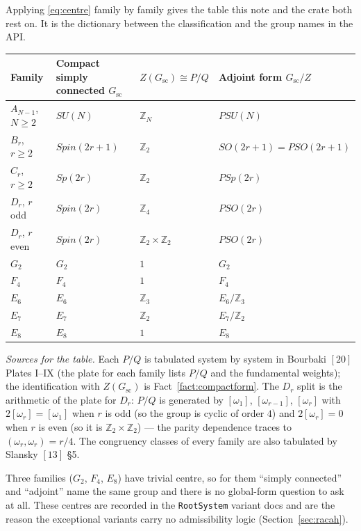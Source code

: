 \documentclass[11pt,a4paper]{article}
\theoremstyle{plain}
\theoremstyle{definition}
\newcommand{\ZZ}{\mathbb{Z}}
\newcommand{\code}[1]{\texttt{#1}}
\begin{document}
Applying \eqref{eq:centre} family by family gives the table this note and the
crate both rest on. It is the dictionary between the classification and the
group names in the API.

\begin{center}
\small
\begin{tabular}{@{}llll@{}}
\toprule
Family & Compact simply connected $G_{\mathrm{sc}}$ & $Z(G_{\mathrm{sc}})\cong P/Q$ & Adjoint form $G_{\mathrm{sc}}/Z$ \\
\midrule
$A_{N-1}$, $N\ge 2$ & $SU(N)$      & $\ZZ_N$ & $PSU(N)$ \\
$B_r$, $r\ge 2$     & $Spin(2r+1)$ & $\ZZ_2$ & $SO(2r+1)=PSO(2r+1)$ \\
$C_r$, $r\ge 2$     & $Sp(2r)$     & $\ZZ_2$ & $PSp(2r)$ \\
$D_r$, $r$ odd      & $Spin(2r)$   & $\ZZ_4$ & $PSO(2r)$ \\
$D_r$, $r$ even     & $Spin(2r)$   & $\ZZ_2\times\ZZ_2$ & $PSO(2r)$ \\
$G_2$               & $G_2$        & $1$     & $G_2$ \\
$F_4$               & $F_4$        & $1$     & $F_4$ \\
$E_6$               & $E_6$        & $\ZZ_3$ & $E_6/\ZZ_3$ \\
$E_7$               & $E_7$        & $\ZZ_2$ & $E_7/\ZZ_2$ \\
$E_8$               & $E_8$        & $1$     & $E_8$ \\
\bottomrule
\end{tabular}
\end{center}

\noindent
\emph{Sources for the table.} Each $P/Q$ is tabulated system by system in
Bourbaki $[20]$ Plates I--IX (the plate for each family lists $P/Q$ and the
fundamental weights); the identification with $Z(G_{\mathrm{sc}})$ is
Fact~\ref{fact:compactform}. The $D_r$ split is the arithmetic of the plate
for $D_r$: $P/Q$ is generated by $[\omega_1]$, $[\omega_{r-1}]$,
$[\omega_r]$ with $2[\omega_r] = [\omega_1]$ when $r$ is odd (so the group is
cyclic of order $4$) and $2[\omega_r]=0$ when $r$ is even (so it is
$\ZZ_2\times\ZZ_2$) --- the parity dependence traces to
$(\omega_r,\omega_r)=r/4$. The congruency classes of every family are also
tabulated by Slansky $[13]$ \S5.

\medskip
\noindent
Three families ($G_2$, $F_4$, $E_8$) have trivial centre, so for them
``simply connected'' and ``adjoint'' name the same group and there is no
global-form question to ask at all. These centres are recorded in the
\code{RootSystem} variant docs and are the reason the exceptional variants
carry no admissibility logic (Section~\ref{sec:racah}).
\end{document}
